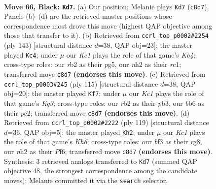 \documentclass[11pt]{article}
\begin{document}
\clearpage

\begin{figure}[p]\centering
\begin{subfigure}{0.46\textwidth}\centering
\resizebox{\linewidth}{!}{%
\newchessgame
\chessboard[
  setfen={2k5/8/1B2b3/8/PK6/1P3Brp/1R5N/8 b - - 11 66},
  showmover=false,
  pgfstyle=straightmove, color=movearrow, markmove={c8-d7}
]}
\caption{}
\end{subfigure}\hfill
\begin{subfigure}{0.46\textwidth}\centering
\resizebox{\linewidth}{!}{%
\newchessgame
\chessboard[
  setfen={8/8/6p1/1k1b2P1/5KP1/1rB2P2/8/2R5 b - - 58 72},
  showmover=false,
  pgfstyle=straightmove, color=movearrow, markmove={b5-c4}
]}
\caption{}
\end{subfigure}
\\[4pt]
\begin{subfigure}{0.46\textwidth}\centering
\resizebox{\linewidth}{!}{%
\newchessgame
\chessboard[
  setfen={5b2/8/6k1/2prB2p/5K2/1P6/2P1R3/8 b - - 1 58},
  showmover=false,
  pgfstyle=straightmove, color=movearrow, markmove={g6-f7}
]}
\caption{}
\end{subfigure}\hfill
\begin{subfigure}{0.46\textwidth}\centering
\resizebox{\linewidth}{!}{%
\newchessgame
\chessboard[
  setfen={2B3R1/8/5p2/4b3/7p/1KP4k/1P3r2/8 b - - 1 60},
  showmover=false,
  pgfstyle=straightmove, color=movearrow, markmove={h3-h2}
]}
\caption{}
\end{subfigure}
\caption{\textbf{Move 66, Black: \texttt{Kd7}.} (a) Our position; Melanie plays \texttt{Kd7} (\texttt{c8d7}). Panels (b)--(d) are the retrieved master positions whose correspondence most drove this move (highest QAP objective among those that transfer to it). (b) Retrieved from \texttt{ccrl\_top\_p0002\#2254} (ply 143) [structural distance $d$=38, QAP obj=23]: the master played \texttt{Kc4}; under $\mu$ our \emph{Kc1} plays the role of that game's \emph{Kb4}; cross-type roles: our \emph{r}b2 as their \emph{p}g5, our \emph{n}h2 as their \emph{r}c1; transferred move \texttt{c8d7} \textbf{(endorses this move)}. (c) Retrieved from \texttt{ccrl\_top\_p0003\#245} (ply 115) [structural distance $d$=38, QAP obj=20]: the master played \texttt{Kf7}; under $\mu$ our \emph{Kc1} plays the role of that game's \emph{Kg3}; cross-type roles: our \emph{r}b2 as their \emph{p}b3, our \emph{b}b6 as their \emph{p}c2; transferred move \texttt{c8d7} \textbf{(endorses this move)}. (d) Retrieved from \texttt{ccrl\_top\_p0002\#2222} (ply 119) [structural distance $d$=36, QAP obj=5]: the master played \texttt{Kh2}; under $\mu$ our \emph{Kc1} plays the role of that game's \emph{Kh6}; cross-type roles: our \emph{b}f3 as their \emph{r}g8, our \emph{n}h2 as their \emph{P}f6; transferred move \texttt{c8d7} \textbf{(endorses this move)}. Synthesis: 3 retrieved analogs transferred to \texttt{Kd7} (summed QAP objective 48, the strongest correspondence among the candidate moves); Melanie committed it via the \texttt{search} selector.}
\label{fig:thought-m131}
\end{figure}
\end{document}
